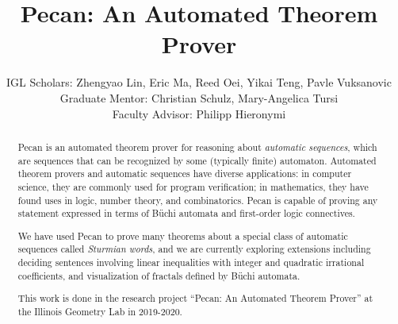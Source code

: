 \documentclass[11pt]{article}
\title{Pecan: An Automated Theorem Prover}
\author{
IGL Scholars: Zhengyao Lin, Eric Ma, Reed Oei, Yikai Teng, Pavle Vuksanovic \\
Graduate Mentor: Christian Schulz, Mary-Angelica Tursi \\
Faculty Advisor: Philipp Hieronymi%
}
\theoremstyle{definition}
\begin{document}

\maketitle

\begin{abstract}

Pecan is an automated theorem prover for reasoning about \emph{automatic sequences}, which are sequences that can be recognized by some (typically finite) automaton.
Automated theorem provers and automatic sequences have diverse applications: in computer science, they are commonly used for program verification; in mathematics, they have found uses in logic, number theory, and combinatorics. Pecan is capable of proving any statement expressed in terms of B\"uchi automata and first-order logic connectives.

We have used Pecan to prove many theorems about a special class of automatic sequences called \emph{Sturmian words}, and we are currently exploring extensions including deciding sentences
involving linear inequalities with integer and quadratic irrational coefficients, and
visualization of fractals defined by B\"uchi automata.

This work is done in the research project ``Pecan: An Automated Theorem Prover'' at the Illinois Geometry Lab in 2019-2020.

\end{abstract}

\end{document}
